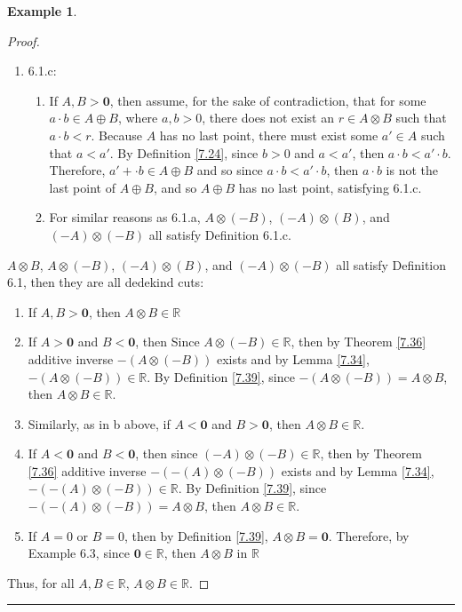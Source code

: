 \documentclass[openany, amssymb, psamsfonts]{amsart}
\newcommand{\bbR}{\mathbb{R}}
\theoremstyle{definition}
\newtheorem{exmp}{Example}[section]
\numberwithin{equation}{section}
\begin{document}
\begin{exmp}
\begin{enumerate}[(a)]
\begin{proof}
\begin{enumerate}
\begin{enumerate}
\end{enumerate}
\item 6.1.c:
\begin{enumerate}
    \item If $A,B > \textbf{0}$, then assume, for the sake of contradiction, that for some $a\cdot b\in A\oplus B$, where $a,b >0$, there does not exist an $r\in A\otimes B$ such that $a\cdot b<r$. Because $A$ has no last point, there must exist some $a'\in A$ such that $a<a'$. By Definition \ref{7.24}, since $b>0$ and $a<a'$, then $a\cdot b < a' \cdot b$. Therefore, $a'+\cdot b \in A\oplus B$ and so since $a\cdot b<a'\cdot b$, then $a\cdot b$ is not the last point of $A\oplus B$, and so $A\oplus B$ has no last point, satisfying 6.1.c.
    \item For similar reasons as 6.1.a, $A \otimes (-B)$, $(-A) \otimes (B)$, and $(-A)\otimes (-B)$ all satisfy Definition 6.1.c.
\end{enumerate}
    \end{enumerate} $A\otimes B$, $A \otimes (-B)$, $(-A) \otimes (B)$, and $(-A)\otimes (-B)$ all satisfy Definition 6.1, then they are all dedekind cuts:
    \begin{enumerate}
        \item If $A,B > \textbf{0}$, then $A\otimes B \in \bbR$
        \item If $A> \textbf{0}$ and $B< \textbf{0}$, then Since $A\otimes (-B)\in \bbR$, then by Theorem \ref{7.36} additive inverse $-(A\otimes (-B))$ exists and by Lemma \ref{7.34}, $-(A\otimes (-B)) \in \bbR$. By Definition \ref{7.39}, since $-(A\otimes (-B)) = A\otimes B$, then $A\otimes B \in \bbR$.
        \item Similarly, as in b above, if $A< \textbf{0}$ and $B> \textbf{0}$, then $A\otimes B \in \bbR$.
        \item If $A< \textbf{0}$ and $B< \textbf{0}$, then since $(-A)\otimes (-B) \in \bbR$, then by Theorem \ref{7.36} additive inverse $-(-(A)\otimes (-B))$ exists and by Lemma \ref{7.34}, $-(-(A)\otimes (-B)) \in \bbR$. By Definition \ref{7.39}, since $-(-(A)\otimes (-B)) = A\otimes B$, then $A\otimes B \in \bbR$.
        \item If $A=0$ or $B=0$, then by Definition \ref{7.39}, $A\otimes B = \textbf{0}$. Therefore, by Example 6.3, since $\textbf{0}\in \bbR$, then $A\otimes B$ in $\bbR$
    \end{enumerate}
Thus, for all $A,B \in \bbR$, $A\otimes B \in \bbR$.
\end{proof}
\vspace{4pt}     \hrule   \vspace{4pt}

\end{enumerate}
\end{exmp}
\end{document}
